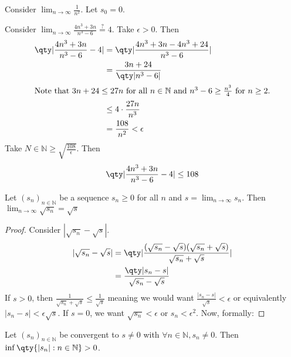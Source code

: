 \documentclass[../notes.tex]{subfiles}
\begin{document}
\begin{example}
	Consider $\lim_{n\to \infty} \frac{1}{n^2}$. Let $s_0 = 0$.
\end{example}

\begin{example}
	Consider $\lim_{n \to \infty} \frac{4n^3 + 3n}{n^3 - 6} \overset{?}{=} 4$. Take $\epsilon > 0$. Then
	\begin{align*}
		\qty|\frac{4n^3 + 3n}{n^3 - 6} - 4| &= \qty|\frac{4n^3 + 3n - 4n^3 + 24}{n^3 - 6}| \\
											&= \frac{3n + 24}{\qty|n^3 - 6|} \\
											\intertext{Note that $3n + 24 \leq 27n$ for all $n \in \mathbb{N}$ and $n^3 - 6 \geq \frac{n^3}{4}$ for $n \geq 2$.}
											&\leq 4 \cdot \frac{27n}{n^3} \\
											&= \frac{108}{n^2} < \epsilon
	\end{align*}
	Take $N \in \mathbb{N} \geq \sqrt{\frac{108}{\epsilon}}$. Then
	\[
		\qty|\frac{4n^3 + 3n}{n^3 - 6} - 4| \leq 108
	\]
\end{example}

\begin{theorem}
	Let $(s_n)_{n\in \mathbb{N}}$ be a sequence $s_n \geq 0$ for all $n$ and $s = \lim_{n\to \infty} s_n$. Then $\lim_{n\to \infty} \sqrt{s_n} = \sqrt{s}$
\end{theorem}

\begin{proof}
	Consider $|\sqrt{s_n} - \sqrt{s}|$.
	\begin{align*}
		|\sqrt{s_n} - \sqrt{s}| &= \qty|\frac{(\sqrt{s_n} - \sqrt{s})(\sqrt{s_n} + \sqrt{s})}{\sqrt{s_n} + \sqrt{s}}| \\
								&= \frac{\qty|s_n - s|}{\sqrt{s_n} - \sqrt{s}}
	\end{align*}
	If $s > 0$, then $\frac{1}{\sqrt{s_n} + \sqrt{s}} \leq \frac{1}{\sqrt{s}}$ meaning we would want $\frac{|s_n - s|}{\sqrt{s}} < \epsilon$ or equivalently $|s_n - s| < \epsilon\sqrt{s}$. If $s = 0$, we want $\sqrt{s_n} < \epsilon$ or $s_n < \epsilon^2$. Now, formally:


\end{proof}

\begin{theorem}
	Let $(s_n)_{n\in \mathbb{N}}$ be convergent to $s \neq 0$ with $\forall n \in \mathbb{N}, s_n \neq 0$. Then $\inf\qty{|s_n| : n \in \mathbb{N}} > 0$.
\end{theorem}
\end{document}
